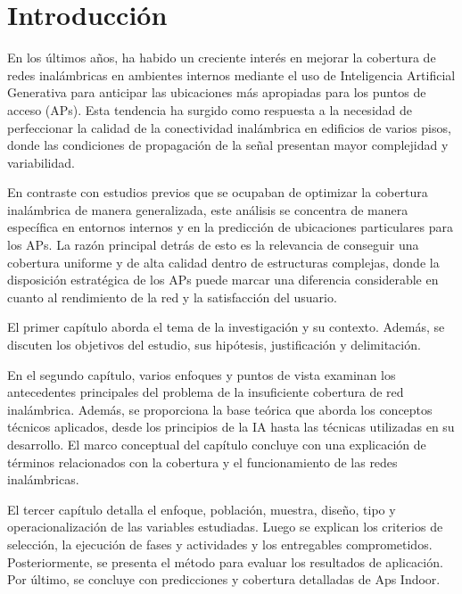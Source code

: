 
\chapter*{Introducción}

En los últimos años, ha habido un creciente interés en mejorar la cobertura de redes inalámbricas en ambientes internos mediante el uso de Inteligencia Artificial Generativa para anticipar las ubicaciones más apropiadas para los puntos de acceso (APs). Esta tendencia ha surgido como respuesta a la necesidad de perfeccionar la calidad de la conectividad inalámbrica en edificios de varios pisos, donde las condiciones de propagación de la señal presentan mayor complejidad y variabilidad.

En contraste con estudios previos que se ocupaban de optimizar la cobertura inalámbrica de manera generalizada, este análisis se concentra de manera específica en entornos internos y en la predicción de ubicaciones particulares para los APs. La razón principal detrás de esto es la relevancia de conseguir una cobertura uniforme y de alta calidad dentro de estructuras complejas, donde la disposición estratégica de los APs puede marcar una diferencia considerable en cuanto al rendimiento de la red y la satisfacción del usuario.

El primer capítulo aborda el tema de la investigación y su contexto. Además, se discuten los objetivos del estudio, sus hipótesis, justificación y delimitación.

En el segundo capítulo, varios enfoques y puntos de vista examinan los antecedentes principales del problema de la insuficiente cobertura de red inalámbrica. Además, se proporciona la base teórica que aborda los conceptos técnicos aplicados, desde los principios de la IA hasta las técnicas utilizadas en su desarrollo. El marco conceptual del capítulo concluye con una explicación de términos relacionados con la cobertura y el funcionamiento de las redes inalámbricas.

El tercer capítulo detalla el enfoque, población, muestra, diseño, tipo y operacionalización de las variables estudiadas. Luego se explican los criterios de selección, la ejecución de fases y actividades y los entregables comprometidos. Posteriormente, se presenta el método para evaluar los resultados de aplicación. Por último, se concluye con predicciones y cobertura detalladas de Aps Indoor.

